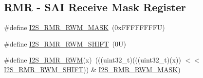 \subsection*{R\+MR -\/ S\+AI Receive Mask Register}
\begin{DoxyCompactItemize}
\item 
\#define \mbox{\hyperlink{group___i2_s___register___masks_ga72f2c1e6c8be00aa0227c8d924c3506a}{I2\+S\+\_\+\+R\+M\+R\+\_\+\+R\+W\+M\+\_\+\+M\+A\+SK}}~(0x\+F\+F\+F\+F\+F\+F\+F\+F\+U)
\item 
\#define \mbox{\hyperlink{group___i2_s___register___masks_gaf69010ae59c583206d59a8cc0c681c04}{I2\+S\+\_\+\+R\+M\+R\+\_\+\+R\+W\+M\+\_\+\+S\+H\+I\+FT}}~(0\+U)
\item 
\#define \mbox{\hyperlink{group___i2_s___register___masks_ga7c42aae38ae5b259cf5def11533ba076}{I2\+S\+\_\+\+R\+M\+R\+\_\+\+R\+WM}}(x)~(((uint32\+\_\+t)(((uint32\+\_\+t)(x)) $<$$<$ \mbox{\hyperlink{group___i2_s___register___masks_gaf69010ae59c583206d59a8cc0c681c04}{I2\+S\+\_\+\+R\+M\+R\+\_\+\+R\+W\+M\+\_\+\+S\+H\+I\+FT}})) \& \mbox{\hyperlink{group___i2_s___register___masks_ga72f2c1e6c8be00aa0227c8d924c3506a}{I2\+S\+\_\+\+R\+M\+R\+\_\+\+R\+W\+M\+\_\+\+M\+A\+SK}})
\end{DoxyCompactItemize}
